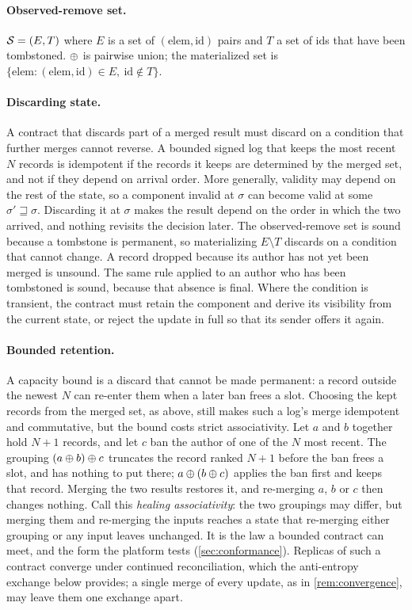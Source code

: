\paragraph{Observed-remove set.} $\statespace = (E, T)$ where $E$ is a set of $(\mathrm{elem}, \mathrm{id})$ pairs and $T$ a set of $\mathrm{id}$s that have been tombstoned. $\merge$ is pairwise union; the materialized set is $\{\mathrm{elem} : (\mathrm{elem}, \mathrm{id}) \in E,\ \mathrm{id} \notin T\}$.

\paragraph{Discarding state.} A contract that discards part of a merged result must discard on a condition that further merges cannot reverse. A bounded signed log that keeps the most recent $N$ records is idempotent if the records it keeps are determined by the merged set, and not if they depend on arrival order. More generally, validity may depend on the rest of the state, so a component invalid at $\sigma$ can become valid at some $\sigma' \sqsupseteq \sigma$. Discarding it at $\sigma$ makes the result depend on the order in which the two arrived, and nothing revisits the decision later. The observed-remove set is sound because a tombstone is permanent, so materializing $E \setminus T$ discards on a condition that cannot change. A record dropped because its author has not yet been merged is unsound. The same rule applied to an author who has been tombstoned is sound, because that absence is final. Where the condition is transient, the contract must retain the component and derive its visibility from the current state, or reject the update in full so that its sender offers it again.

\paragraph{Bounded retention.} A capacity bound is a discard that cannot be made permanent: a record outside the newest $N$ can re-enter them when a later ban frees a slot. Choosing the kept records from the merged set, as above, still makes such a log's merge idempotent and commutative, but the bound costs strict associativity. Let $a$ and $b$ together hold $N+1$ records, and let $c$ ban the author of one of the $N$ most recent. The grouping $(a \merge b) \merge c$ truncates the record ranked $N+1$ before the ban frees a slot, and has nothing to put there; $a \merge (b \merge c)$ applies the ban first and keeps that record. Merging the two results restores it, and re-merging $a$, $b$ or $c$ then changes nothing. Call this \emph{healing associativity}: the two groupings may differ, but merging them and re-merging the inputs reaches a state that re-merging either grouping or any input leaves unchanged. It is the law a bounded contract can meet, and the form the platform tests (\cref{sec:conformance}). Replicas of such a contract converge under continued reconciliation, which the anti-entropy exchange below provides; a single merge of every update, as in \cref{rem:convergence}, may leave them one exchange apart.


